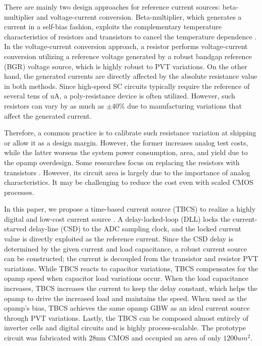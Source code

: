 \documentclass[letterpaper, 10 pt, conference]{ieeeconf}  %
\begin{document}
There are mainly two design approaches for reference current sources: beta-multiplier and voltage-current conversion. Beta-multiplier, which generates a current in a self-bias fashion, exploits the complementary temperature characteristics of resistors and transistors to cancel the temperature dependence \cite{azcona2014precision, osipov2016temperature}. In the voltage-current conversion approach, a resistor performs voltage-current conversion utilizing a reference voltage generated by a robust bandgap reference (BGR) voltage source, which is highly robust to PVT variations\cite{banba1999cmos, ueno2009300, ueno20101}. On the other hand, the generated currents are directly affected by the absolute resistance value in both methods. Since high-speed SC circuits typically require the reference of several tens of uA, a poly-resistance device is often utilized. However, such resistors can vary by as much as $\pm40\%$ due to manufacturing variations that affect the generated current.

Therefore, a common practice is to calibrate such resistance variation at shipping or allow it as a design margin. However, the former increases analog test costs, while the latter worsens the system power consumption, area, and yield due to the opamp overdesign. Some researches focus on replacing the resistors with transistors \cite{hirose2010nano, hirose2010cmos, osaki20131, choi201423pw}. However, its circuit area is largely due to the importance of analog characteristics. It may be challenging to reduce the cost even with scaled CMOS processes.

In this paper, we propose a time-based current source (TBCS) to realize a highly digital and low-cost current source \cite{yoshioka201728}. A delay-locked-loop (DLL) locks the current-starved delay-line (CSD) to the ADC sampling clock, and the locked current value is directly exploited as the reference current. 
Since the CSD delay is determined by the given current and load capacitance, a robust current source can be constructed; the current is decoupled from the transistor and resistor PVT variations.
While TBCS reacts to capacitor variations, TBCS compensates for the opamp speed when capacitor load variations occur. 
When the load capacitance increases, TBCS increases the current to keep the delay constant, which helps the opamp to drive the increased load and maintains the speed. When used as the opamp's bias, TBCS achieves the same opamp GBW as an ideal current source through PVT variations.
Lastly, the TBCS can be composed almost entirely of inverter cells and digital circuits and is highly process-scalable. The prototype circuit was fabricated with 28nm CMOS and occupied an area of only $1200um^2$.
\end{document}
